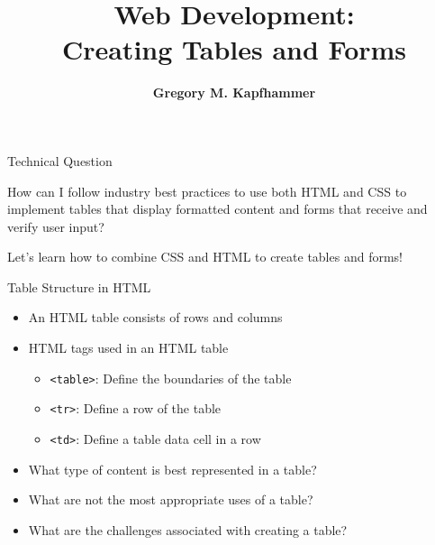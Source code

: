 \documentclass[14pt,aspectratio=169]{beamer}
\title{Web Development: \\ Creating Tables and Forms}
\author{{\bf Gregory M. Kapfhammer}}
\institute[shortinst]{{\bf Department of Computer Science, Allegheny College}}
\begin{document}
{
  \begin{frame}
    \titlepage
  \end{frame}
}

%
\begin{frame}{Technical Question}
  \hspace*{.25in}
  \vspace*{.1in}
  \begin{minipage}{4.5in}
  \begin{center}
    {\large How can I follow industry best practices to use both HTML and CSS to
    implement tables that display formatted content and forms that receive and
  verify user input?}
  \end{center}
  \end{minipage}
  \vspace{2ex}
  \begin{center}
    \small Let's learn how to combine CSS and HTML to create tables and forms!
  \end{center}
\end{frame}

%
\begin{frame}{Table Structure in HTML}
  \begin{itemize}
    \item An HTML table consists of rows and columns
      \vspace*{-.1in}
    \item HTML tags used in an HTML table
      \begin{itemize}
        \item {\tt <table>}: Define the boundaries of the table
        \item {\tt <tr>}: Define a row of the table
        \item {\tt <td>}: Define a table data cell in a row
      \end{itemize}
      \vspace*{-.2in}
    \item What type of content is best represented in a table?
      \vspace*{-.2in}
    \item What are not the most appropriate uses of a table?
      \vspace*{-.2in}
    \item What are the challenges associated with creating a table?
  \end{itemize}
\end{frame}
\end{document}
